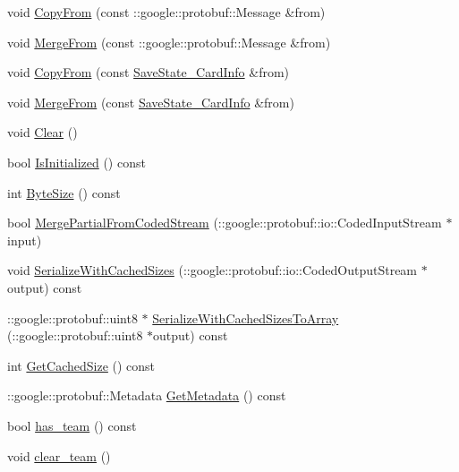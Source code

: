 \begin{DoxyCompactItemize}
\item 
void \hyperlink{class_save_state___card_info_ad973785a64e464c46f9ee3d5cb8b4b84}{Copy\-From} (const \-::google\-::protobuf\-::\-Message \&from)
\item 
void \hyperlink{class_save_state___card_info_ae54497ca9d2a7476cb589cc2482270e3}{Merge\-From} (const \-::google\-::protobuf\-::\-Message \&from)
\item 
void \hyperlink{class_save_state___card_info_a5013546e3552e1e28e23e463006af962}{Copy\-From} (const \hyperlink{class_save_state___card_info}{Save\-State\-\_\-\-Card\-Info} \&from)
\item 
void \hyperlink{class_save_state___card_info_a97d0fb8622918831d5e8bb72b4c4640d}{Merge\-From} (const \hyperlink{class_save_state___card_info}{Save\-State\-\_\-\-Card\-Info} \&from)
\item 
void \hyperlink{class_save_state___card_info_af6adc059a62f22a0212a6d63d9b0b359}{Clear} ()
\item 
bool \hyperlink{class_save_state___card_info_ab58c6e26b988059c36a6fa80a9330604}{Is\-Initialized} () const 
\item 
int \hyperlink{class_save_state___card_info_aa03f468088e51f3a12c656febf4f4ee9}{Byte\-Size} () const 
\item 
bool \hyperlink{class_save_state___card_info_ac2a9a242b4832501004bb2d54981c663}{Merge\-Partial\-From\-Coded\-Stream} (\-::google\-::protobuf\-::io\-::\-Coded\-Input\-Stream $\ast$input)
\item 
void \hyperlink{class_save_state___card_info_a3ce7e3f1f21f9f99dc9d2e3349e52d16}{Serialize\-With\-Cached\-Sizes} (\-::google\-::protobuf\-::io\-::\-Coded\-Output\-Stream $\ast$output) const 
\item 
\-::google\-::protobuf\-::uint8 $\ast$ \hyperlink{class_save_state___card_info_ae4060b980455e8e3a9e52ad046351dcb}{Serialize\-With\-Cached\-Sizes\-To\-Array} (\-::google\-::protobuf\-::uint8 $\ast$output) const 
\item 
int \hyperlink{class_save_state___card_info_a451f5836502102c6e6364debae5a4bc7}{Get\-Cached\-Size} () const 
\item 
\-::google\-::protobuf\-::\-Metadata \hyperlink{class_save_state___card_info_a6d02b2207a894a84d08351374906ba11}{Get\-Metadata} () const 
\item 
bool \hyperlink{class_save_state___card_info_abdefd75dcf89e9b9c76ae1b474e7324b}{has\-\_\-team} () const 
\item 
void \hyperlink{class_save_state___card_info_a5225ab7dff6d2024c81bf56649d3c5a3}{clear\-\_\-team} ()

\end{DoxyCompactItemize}
